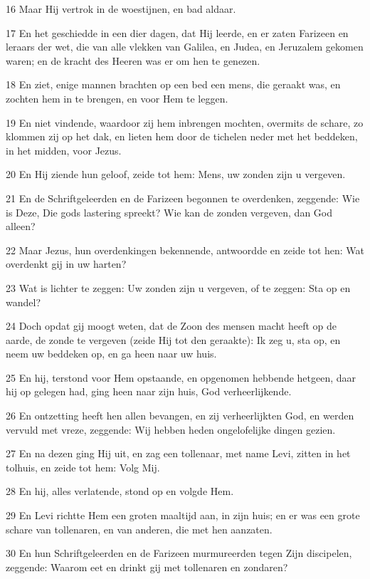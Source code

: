 \par 16 Maar Hij vertrok in de woestijnen, en bad aldaar.
\par 17 En het geschiedde in een dier dagen, dat Hij leerde, en er zaten Farizeen en leraars der wet, die van alle vlekken van Galilea, en Judea, en Jeruzalem gekomen waren; en de kracht des Heeren was er om hen te genezen.
\par 18 En ziet, enige mannen brachten op een bed een mens, die geraakt was, en zochten hem in te brengen, en voor Hem te leggen.
\par 19 En niet vindende, waardoor zij hem inbrengen mochten, overmits de schare, zo klommen zij op het dak, en lieten hem door de tichelen neder met het beddeken, in het midden, voor Jezus.
\par 20 En Hij ziende hun geloof, zeide tot hem: Mens, uw zonden zijn u vergeven.
\par 21 En de Schriftgeleerden en de Farizeen begonnen te overdenken, zeggende: Wie is Deze, Die gods lastering spreekt? Wie kan de zonden vergeven, dan God alleen?
\par 22 Maar Jezus, hun overdenkingen bekennende, antwoordde en zeide tot hen: Wat overdenkt gij in uw harten?
\par 23 Wat is lichter te zeggen: Uw zonden zijn u vergeven, of te zeggen: Sta op en wandel?
\par 24 Doch opdat gij moogt weten, dat de Zoon des mensen macht heeft op de aarde, de zonde te vergeven (zeide Hij tot den geraakte): Ik zeg u, sta op, en neem uw beddeken op, en ga heen naar uw huis.
\par 25 En hij, terstond voor Hem opstaande, en opgenomen hebbende hetgeen, daar hij op gelegen had, ging heen naar zijn huis, God verheerlijkende.
\par 26 En ontzetting heeft hen allen bevangen, en zij verheerlijkten God, en werden vervuld met vreze, zeggende: Wij hebben heden ongelofelijke dingen gezien.
\par 27 En na dezen ging Hij uit, en zag een tollenaar, met name Levi, zitten in het tolhuis, en zeide tot hem: Volg Mij.
\par 28 En hij, alles verlatende, stond op en volgde Hem.
\par 29 En Levi richtte Hem een groten maaltijd aan, in zijn huis; en er was een grote schare van tollenaren, en van anderen, die met hen aanzaten.
\par 30 En hun Schriftgeleerden en de Farizeen murmureerden tegen Zijn discipelen, zeggende: Waarom eet en drinkt gij met tollenaren en zondaren?
